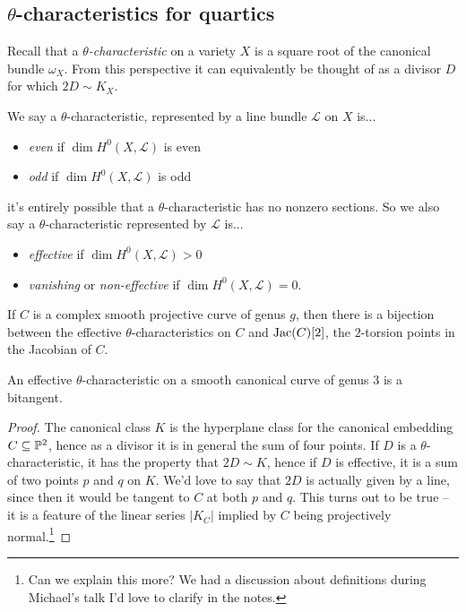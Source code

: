\documentclass[11pt]{amsart}
\begin{document}
\subsection{\texorpdfstring{$\theta$}{theta}-characteristics for quartics}

Recall that a $\theta$\textit{-characteristic} on a variety $X$ is a square root of the canonical bundle $\omega_X$. From this perspective it can equivalently be thought of as a divisor $D$ for which $2D \sim K_X$.

\begin{definition} We say a $\theta$-characteristic, represented by a line bundle $\mathcal{L}$ on $X$ is...
\begin{itemize}
    \item \textit{even} if $\dim H^0(X,\mathcal{L})$ is even
    \item \textit{odd} if $\dim H^0(X,\mathcal{L})$ is odd
\end{itemize}
it's entirely possible that a $\theta$-characteristic has no nonzero sections. So we also say a $\theta$-characteristic represented by $\mathcal{L}$ is...
\begin{itemize}
    \item \textit{effective} if $\dim H^0(X,\mathcal{L})>0$
    \item \textit{vanishing} or \textit{non-effective} if $\dim H^0(X,\mathcal{L}) = 0$.
\end{itemize}
\end{definition}

\begin{remark} If $C$ is a complex smooth projective curve of genus $g$, then there is a bijection between the effective $\theta$-characteristics on $C$ and $\Jac(C)[2]$, the $2$-torsion points in the Jacobian of $C$.
\end{remark}

\begin{example} An effective $\theta$-characteristic on a smooth canonical curve of genus $3$ is a bitangent.
\end{example}
\begin{proof} The canonical class $K$ is the hyperplane class for the canonical embedding $C \subseteq \P^2$, hence as a divisor it is in general the sum of four points. If $D$ is a $\theta$-characteristic, it has the property that $2D \sim K$, hence if $D$ is effective, it is a sum of two points $p$ and $q$ on $K$. We'd love to say that $2D$ is actually given by a line, since then it would be tangent to $C$ at both $p$ and $q$. This turns out to be true -- it is a feature of the linear series $|K_C|$ implied by $C$ being projectively normal.\footnote{Can we explain this more? We had a discussion about definitions during Michael's talk I'd love to clarify in the notes.}
\end{proof}
\end{document}
